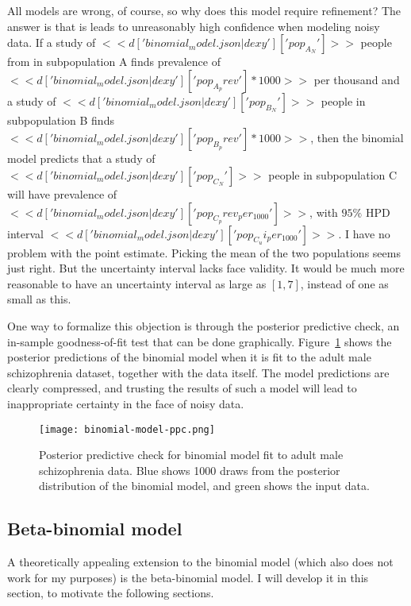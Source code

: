 All models are wrong, of course, so why does this model require
refinement? The answer is that is leads to unreasonably high
confidence when modeling noisy data.  If a study of
$<<d['binomial_model.json|dexy']['pop_A_N']>>$ people from in
subpopulation A finds prevalence of
$<<d['binomial_model.json|dexy']['pop_A_prev']*1000>>$ per thousand and
a study of $<<d['binomial_model.json|dexy']['pop_B_N']>>$ people in
subpopulation B finds $<<
d['binomial_model.json|dexy']['pop_B_prev']*1000 >>$, then the
binomial model predicts that a study of
$<<d['binomial_model.json|dexy']['pop_C_N']>>$ people in subpopulation
C will have prevalence of
$<<d['binomial_model.json|dexy']['pop_C_prev_per_1000']>>$, with
$95\%$ HPD interval
$<<d['binomial_model.json|dexy']['pop_C_ui_per_1000']>>$.  I have
no problem with the point estimate.  Picking the mean of the two
populations seems just right.  But the uncertainty interval lacks face
validity.  It would be much more reasonable to have an uncertainty
interval as large as $[1,7]$, instead of one as small as this.

One way to formalize this objection is through the posterior
predictive check, an in-sample goodness-of-fit test that can be done
graphically.  Figure~\ref{fig:theory-rate_model-binom_ppc} shows the
posterior predictions of the binomial model when it is fit to the
adult male schizophrenia dataset, together with the data itself.  The
model predictions are clearly compressed, and trusting the results of
such a model will lead to inappropriate certainty in the face of noisy
data.

\begin{figure}[ht]
\begin{center}
\texttt{[image: binomial-model-ppc.png]}
\end{center}
\caption{Posterior predictive check for binomial model fit to adult
  male schizophrenia data.  Blue shows 1000 draws from the posterior
  distribution of the binomial model, and green shows the input data.}
\label{fig:theory-rate_model-binom_ppc}
\end{figure}




\subsection{Beta-binomial model}
\label{beta-binomial-model}
A theoretically appealing extension to the binomial model (which also
does not work for my purposes) is the beta-binomial model.  I will
develop it in this section, to motivate the following sections.

